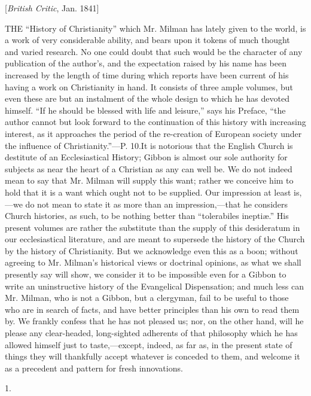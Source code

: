 
[\emph{British Critic}, Jan. 1841]

THE ``History
of Christianity'' which Mr. Milman has lately given to the world, is a
work of very considerable ability, and bears upon it tokens of much
thought and varied research. No one could doubt that such would be the
character of any publication of the author's, and the expectation
raised by his name has been increased by the length of time during
which reports have been current of his having a work on Christianity
in hand. It consists of three ample volumes, but even these are but an
instalment of the whole design to which he has devoted himself. ``If he
should be blessed with life and leisure,'' says his Preface, ``the
author cannot but look forward to the continuation of this history
with increasing interest, as it approaches the period of the
re-creation of European society under the influence of Christianity.''—P.
10.\textbf{}It is notorious that
the English Church is destitute of an Ecclesiastical History; Gibbon
is almost our sole authority for subjects as near the heart of a
Christian as any can well be. We do not indeed mean to say that Mr.
Milman will supply this want; rather we conceive him to hold that it
is a want which ought not to be supplied. Our impression at least
is,—we do not mean to state it as more than an impression,—that he
considers Church histories, as such, to be nothing better than ``tolerabiles
ineptiæ.'' His present volumes are rather the substitute than the
supply of this desideratum in our ecclesiastical literature, and are
meant to supersede the history of the Church by the history of
Christianity. But we acknowledge even this as a boon; without agreeing
to Mr. Milman's historical views or doctrinal opinions, as what we
shall presently say will show, we consider it to be impossible even
for a Gibbon to write an uninstructive history of the Evangelical
Dispensation; and much less can Mr. Milman, who is not a Gibbon, but a
clergyman, fail to be useful to those who are in search of facts, and
have better principles than his own to read them by. We frankly
confess that he has not pleased us; nor, on the other hand, will he
please any clear-headed, long-sighted adherents of that philosophy
which he has allowed himself just to taste,—except, indeed, as far
as, in the present state of things they will thankfully accept
whatever is conceded to them, and welcome it as a precedent and
pattern for fresh innovations.

1.

